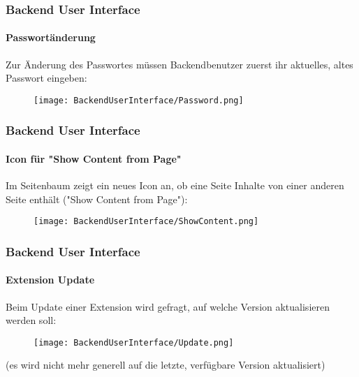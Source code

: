 \begin{frame}[fragile]
	\frametitle{Backend User Interface}
	\framesubtitle{Passwortänderung}

	Zur Änderung des Passwortes müssen Backendbenutzer zuerst ihr aktuelles, altes
	Passwort eingeben:

	\begin{figure}
		\texttt{[image: BackendUserInterface/Password.png]}
	\end{figure}

\end{frame}

\begin{frame}[fragile]
	\frametitle{Backend User Interface}
	\framesubtitle{Icon für "Show Content from Page"}

	Im Seitenbaum zeigt ein neues Icon an, ob eine Seite Inhalte von einer anderen
	Seite enthält ("Show Content from Page"):

	\begin{figure}
		\texttt{[image: BackendUserInterface/ShowContent.png]}
	\end{figure}

\end{frame}

\begin{frame}[fragile]
	\frametitle{Backend User Interface}
	\framesubtitle{Extension Update}

	Beim Update einer Extension wird gefragt, auf welche Version aktualisieren werden soll:

	\begin{figure}
		\texttt{[image: BackendUserInterface/Update.png]}
	\end{figure}

	\small(es wird nicht mehr generell auf die letzte, verfügbare Version aktualisiert)\normalsize

\end{frame}

